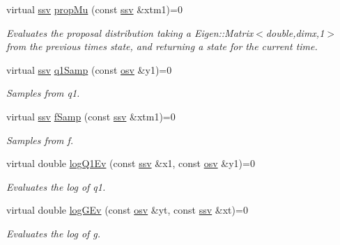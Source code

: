 \begin{DoxyCompactItemize}
virtual \hyperlink{classpf_1_1APF_aa7fe7efd37dc23b06812aebdee256897}{ssv} \hyperlink{classpf_1_1APF_a25a1cba6c74c8c7e43d39fcca90a9fad}{prop\+Mu} (const \hyperlink{classpf_1_1APF_aa7fe7efd37dc23b06812aebdee256897}{ssv} \&xtm1)=0
\begin{DoxyCompactList}\small\item\em Evaluates the proposal distribution taking a Eigen\+::\+Matrix$<$double,dimx,1$>$ from the previous time\textquotesingle{}s state, and returning a state for the current time. \end{DoxyCompactList}\item 
virtual \hyperlink{classpf_1_1APF_aa7fe7efd37dc23b06812aebdee256897}{ssv} \hyperlink{classpf_1_1APF_a253087b9333ad8cbcd8cb9f21277bc48}{q1\+Samp} (const \hyperlink{classpf_1_1APF_a852db242b5d02c58dc4e6a183a8cab65}{osv} \&y1)=0
\begin{DoxyCompactList}\small\item\em Samples from q1. \end{DoxyCompactList}\item 
virtual \hyperlink{classpf_1_1APF_aa7fe7efd37dc23b06812aebdee256897}{ssv} \hyperlink{classpf_1_1APF_af99ef9dc1a78b32dafecb43e9f74d2a0}{f\+Samp} (const \hyperlink{classpf_1_1APF_aa7fe7efd37dc23b06812aebdee256897}{ssv} \&xtm1)=0
\begin{DoxyCompactList}\small\item\em Samples from f. \end{DoxyCompactList}\item 
virtual double \hyperlink{classpf_1_1APF_af706e40e1ccac9e36afc3fbd8cc515fd}{log\+Q1\+Ev} (const \hyperlink{classpf_1_1APF_aa7fe7efd37dc23b06812aebdee256897}{ssv} \&x1, const \hyperlink{classpf_1_1APF_a852db242b5d02c58dc4e6a183a8cab65}{osv} \&y1)=0
\begin{DoxyCompactList}\small\item\em Evaluates the log of q1. \end{DoxyCompactList}\item 
virtual double \hyperlink{classpf_1_1APF_a86a7cfd8ff411f8ed5f63d454c28afd2}{log\+G\+Ev} (const \hyperlink{classpf_1_1APF_a852db242b5d02c58dc4e6a183a8cab65}{osv} \&yt, const \hyperlink{classpf_1_1APF_aa7fe7efd37dc23b06812aebdee256897}{ssv} \&xt)=0
\begin{DoxyCompactList}\small\item\em Evaluates the log of g. \end{DoxyCompactList}\end{DoxyCompactItemize}
